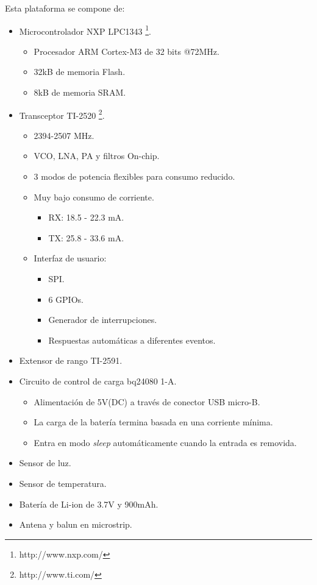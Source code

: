 \noindent Esta plataforma se compone de:
\begin{itemize}
\item Microcontrolador NXP LPC1343 \footnote{http://www.nxp.com/}.
   \begin{itemize}
   \item Procesador ARM Cortex-M3 de 32 bits @72MHz. 
   \item 32kB de memoria Flash.
   \item 8kB de memoria SRAM.
   \end{itemize}
\item Transceptor TI-2520 \footnote{http://www.ti.com/}.
		\begin{itemize}
			\item 2394-2507 MHz.
			\item VCO, LNA, PA y filtros On-chip.
			\item 3 modos de potencia flexibles para consumo reducido.
			\item Muy bajo consumo de corriente.
			\begin{itemize}
				\item RX: 18.5 - 22.3 mA.
				\item TX: 25.8 - 33.6 mA.
			\end{itemize}
			\item Interfaz de usuario:
			\begin{itemize}
				\item SPI.
				\item 6 GPIOs.
 				\item Generador de interrupciones.
				\item Respuestas automáticas a diferentes eventos.
			\end{itemize}
		\end{itemize}
\item Extensor de rango TI-2591.
\item Circuito de control de carga bq24080 1-A.
		\begin{itemize}
			\item Alimentación de 5V(DC) a través de conector USB micro-B.
			\item La carga de la batería termina basada en una corriente mínima.
			\item Entra en modo \textit{sleep} automáticamente cuando la entrada es removida.		
		\end{itemize}
\item Sensor de luz.
\item Sensor de temperatura.
\item Batería de Li-ion de 3.7V y 900mAh.
\item Antena y balun en microstrip.
\end{itemize}

